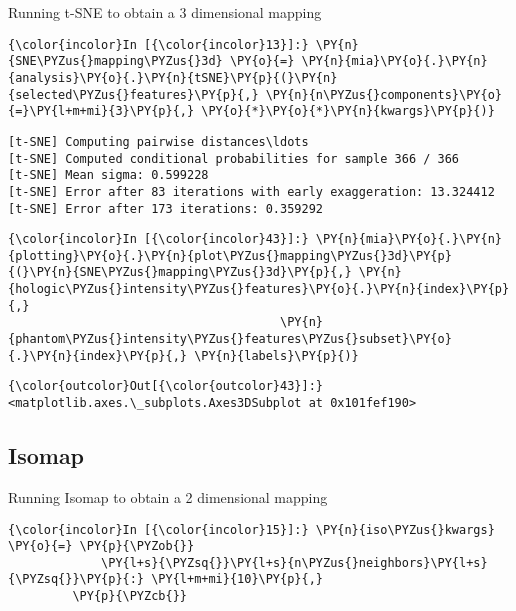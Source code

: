     Running t-SNE to obtain a 3 dimensional mapping

    \begin{Verbatim}[commandchars=\\\{\}]
{\color{incolor}In [{\color{incolor}13}]:} \PY{n}{SNE\PYZus{}mapping\PYZus{}3d} \PY{o}{=} \PY{n}{mia}\PY{o}{.}\PY{n}{analysis}\PY{o}{.}\PY{n}{tSNE}\PY{p}{(}\PY{n}{selected\PYZus{}features}\PY{p}{,} \PY{n}{n\PYZus{}components}\PY{o}{=}\PY{l+m+mi}{3}\PY{p}{,} \PY{o}{*}\PY{o}{*}\PY{n}{kwargs}\PY{p}{)}
\end{Verbatim}

    \begin{Verbatim}[commandchars=\\\{\}]
[t-SNE] Computing pairwise distances\ldots
[t-SNE] Computed conditional probabilities for sample 366 / 366
[t-SNE] Mean sigma: 0.599228
[t-SNE] Error after 83 iterations with early exaggeration: 13.324412
[t-SNE] Error after 173 iterations: 0.359292
    \end{Verbatim}

    \begin{Verbatim}[commandchars=\\\{\}]
{\color{incolor}In [{\color{incolor}43}]:} \PY{n}{mia}\PY{o}{.}\PY{n}{plotting}\PY{o}{.}\PY{n}{plot\PYZus{}mapping\PYZus{}3d}\PY{p}{(}\PY{n}{SNE\PYZus{}mapping\PYZus{}3d}\PY{p}{,} \PY{n}{hologic\PYZus{}intensity\PYZus{}features}\PY{o}{.}\PY{n}{index}\PY{p}{,}
                                      \PY{n}{phantom\PYZus{}intensity\PYZus{}features\PYZus{}subset}\PY{o}{.}\PY{n}{index}\PY{p}{,} \PY{n}{labels}\PY{p}{)}
\end{Verbatim}

            \begin{Verbatim}[commandchars=\\\{\}]
{\color{outcolor}Out[{\color{outcolor}43}]:} <matplotlib.axes.\_subplots.Axes3DSubplot at 0x101fef190>
\end{Verbatim}

    \subsection{Isomap}\label{isomap}

Running Isomap to obtain a 2 dimensional mapping

    \begin{Verbatim}[commandchars=\\\{\}]
{\color{incolor}In [{\color{incolor}15}]:} \PY{n}{iso\PYZus{}kwargs} \PY{o}{=} \PY{p}{\PYZob{}}
             \PY{l+s}{\PYZsq{}}\PY{l+s}{n\PYZus{}neighbors}\PY{l+s}{\PYZsq{}}\PY{p}{:} \PY{l+m+mi}{10}\PY{p}{,}
         \PY{p}{\PYZcb{}}
\end{Verbatim}

